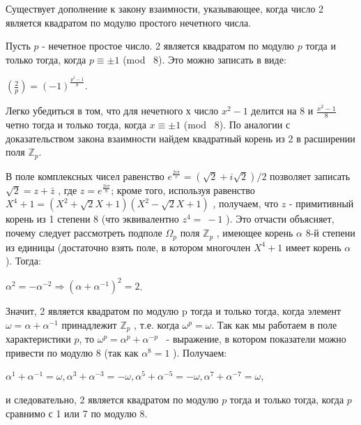 \documentclass{mai_book}
\begin{document}
\newpage

Существует дополнение к закону взаимности, указывающее, когда число 2 является квадратом по модулю простого нечетного числа.

\begin{thm}
Пусть $p$ - нечетное простое число. 2 является квадратом по модулю $p$ тогда и только тогда, когда $p \equiv \pm 1$ (mod \ 8). Это можно записать в виде:

\begin{center}
$(\frac 2p) = (-1)^{\frac{p^2 -1}{8}}$.
\end{center}
\end{thm}
\begin{myproof}

Легко убедиться в том, что для нечетного $х$ число $x^2 -1$
 делится на 8 и $\frac{x^2-1}{8}$
 четно тогда и только тогда, когда $x \equiv \pm 1$ (mod \ 8). По аналогии с доказательством закона взаимности найдем квадратный корень из 2 в расширении поля $\mathbb{Z}_p$.

В поле комплексных чисел равенство $e^{\frac{2i\pi}{e}} = (\sqrt2 + i\sqrt2)/2$
 позволяет записать $\sqrt2 = z + \bar z$
 , где $z = e^{\frac{2i\pi}{8}}$; кроме того, используя равенство $X^4+1 = (X^2 + \sqrt2 X+1)(X^2 - \sqrt2 X+1)$
 , получаем, что $z$ - примитивный корень из 1 степени 8 (что эквивалентно $z^4=~-1$
    ).
Это отчасти объясняет, почему следует рассмотреть подполе $\Omega_p$
 поля $\mathbb{Z}_p$
 , имеющее корень $\alpha$
 8-й степени из единицы (достаточно взять поле, в котором многочлен $X^4+1$
 имеет корень $\alpha$
 ). Тогда:

\begin{center}
$\alpha^2 = -\alpha^{-2} \Longrightarrow (\alpha + \alpha^{-1})^2 = 2$.
\end{center}


Значит, 2 является квадратом по модулю p тогда и только тогда, когда элемент $\omega = \alpha + \alpha^{-1}$
 принадлежит  $\mathbb{Z}_p$
 , т.е. когда $\omega^p = \omega$. Так как мы работаем в поле характеристики $p$, то $\omega^p = \alpha^p + \alpha^{-p}$
 ~- выражение, в котором показатели можно привести по модулю 8 (так как $\alpha^8=1$
    ). Получаем:

\begin{center}
$\alpha^1 + \alpha^{-1} = \omega, \alpha^3 + \alpha^{-3} = -\omega, \alpha^5 + \alpha^{-5} = -\omega, \alpha^7 + \alpha^{-7} = \omega$,
\end{center}


и следовательно, 2 является квадратом по модулю $p$ тогда и только тогда, когда $p$ сравнимо с 1 или 7 по модулю 8.
\end{myproof}
\end{document}
